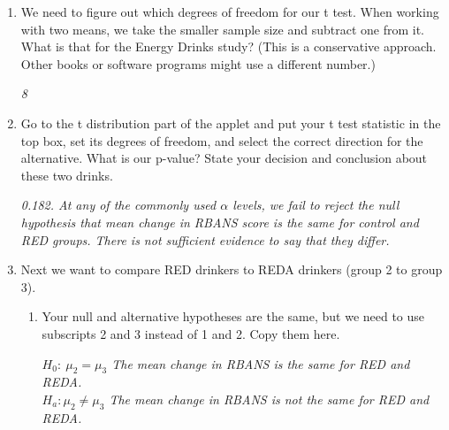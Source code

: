 \begin{enumerate}
\item We need to figure out which degrees of freedom for our t
  test. When working with two means, we take the smaller sample size
  and subtract one from it. What is that for the Energy Drinks study?
  ({\small This is a conservative approach. Other books or software
    programs might use a different number.})
\begin{students}
    \vspace{2.6cm}    
\end{students}

\begin{key}
  {\it  8}
\end{key}

 \item  Go to the t distribution part of the applet and put your t
   test statistic in the top box, 
   set its degrees of freedom, and select the correct direction for the
   alternative.  What is our p-value?  State your decision and 
   conclusion about these two drinks. 
\begin{students}
    \vspace{5cm}    
\end{students}

\begin{key}
  {\it 0.182. At any of the commonly used $\alpha$ levels, we fail to
    reject the null hypothesis that mean change in RBANS score is the
    same for control and RED groups.  There is not sufficient evidence
    to say that they differ.}
\end{key}


 \item  Next we want to compare RED drinkers to REDA drinkers (group 2
   to group 3). 

   \begin{enumerate}
     \item Your null and alternative hypotheses are the same, but we
       need to use subscripts 2 and 3 instead of 1 and 2.  Copy them
       here. 
\begin{students}
    \vspace{2cm}    
\end{students}

\begin{key}
  {\it   $H_0:\ \mu_2 = \mu_3$ The mean change in RBANS is the same
    for RED and REDA.    \\ $H_a: \mu_2 \neq \mu_3$ The
    mean change in RBANS is not the same for RED and REDA.  }
\end{key}
 


\end{enumerate}
\end{enumerate}
